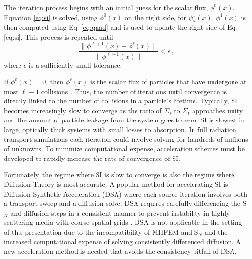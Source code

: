 \documentclass{anstrans}
\newcommand{\SN}{S$_N$\xspace}
\begin{document}
	The iteration process begins with an initial guess for the scalar flux, $\phi^0(x)$. Equation \ref{eq:si} is solved, using $\phi^0(x)$ on the right side, for $\psi_n^1(x)$. $\phi^1(x)$ is then computed using Eq. \ref{eq:quad} and is used to update the right side of Eq. \ref{eq:si}. 
	This process is repeated until 
		\begin{equation} \label{eq:converg}
			\frac{\|\phi^{\ell+1}(x) - \phi^{\ell}(x)\|}{\|\phi^{\ell+1}(x)\|} < \epsilon \,,
		\end{equation}
	where $\epsilon$ is a sufficiently small tolerance. 

	If $\phi^0(x) = 0$, then $\phi^\ell(x)$ is the scalar flux of particles that have undergone at most $\ell - 1$ collisions \cite{adams}. Thus, the number of iterations until convergence is directly linked to the number of collisions in a particle's lifetime. Typically, SI becomes increasingly slow to converge as the ratio of $\Sigma_s$ to $\Sigma_t$ approaches unity and the amount of particle leakage from the system goes to zero. SI is slowest in large, optically thick systems with small losses to absorption. In full radiation transport simulations each iteration could involve solving for hundreds of millions of unknowns. To minimize computational expense, acceleration schemes must be developed to rapidly increase the rate of convergence of SI. 

	Fortunately, the regime where SI is slow to converge is also the regime where Diffusion Theory is most accurate. A popular method for accelerating SI is Diffusion Synthetic Acceleration (DSA) where each source iteration involves both a transport sweep and a diffusion solve. DSA requires carefully differencing the \SN and diffusion steps in a consistent manner to prevent instability in highly scattering media with coarse spatial grids \cite{alcouffe,morel}. DSA is not applicable in the setting of this presentation due to the incompatibility of MHFEM and \SN and the increased computational expense of solving consistently differenced diffusion. A new acceleration method is needed that avoids the consistency pitfall of DSA. 
\end{document}
